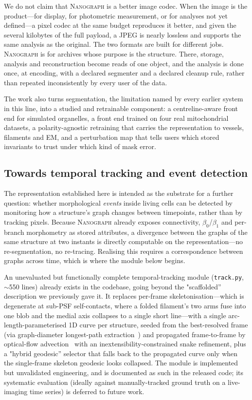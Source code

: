 \documentclass[10pt,a4paper]{article}
\newcommand{\method}{\textnormal{\textsc{Nanograph}}\xspace}
\begin{document}
We do not claim that \method is a better image codec. When the image is
the product---for display, for photometric measurement, or for analyses
not yet defined---a pixel codec at the same budget reproduces it better,
and given the several kilobytes of the full payload, a JPEG is nearly
lossless and supports the same analysis as the original. The two formats
are built for different jobs. \method is for archives whose purpose is the
structure. There, storage, analysis and reconstruction become reads of one
object, and the analysis is done once, at encoding, with a declared
segmenter and a declared cleanup rule, rather than repeated inconsistently
by every user of the data.

The work also turns segmentation, the limitation named by every earlier
system in this line, into a studied and retrainable component: a
centreline-aware front end for simulated organelles, a front end trained on
four real mitochondrial datasets, a polarity-agnostic retraining that
carries the representation to vessels, filaments and EM, and a
perturbation map that tells users which stored invariants to trust under
which kind of mask error.

\subsection{Towards temporal tracking and event detection}
The representation established here is intended as the substrate for a further
question: whether morphological \emph{events} inside living cells can be
detected by monitoring how a structure's graph changes between timepoints,
rather than by tracking pixels. Because \method already exposes connectivity,
$\beta_0$/$\beta_1$ and per-branch morphometry as stored attributes, a
divergence between the graphs of the same structure at two instants is
directly computable on the representation---no re-segmentation, no
re-tracing. Realising this requires a correspondence between graphs across
time, which is where the module below begins.

An unevaluated but functionally complete temporal-tracking module
(\texttt{track.py}, $\sim$550 lines) already exists in the codebase, going
beyond the "scaffolded'' description we previously gave it. It replaces
per-frame skeletonisation---which is degenerate at sub-PSF self-contacts,
where a folded filament's two arms fuse into one blob and the medial axis
collapses to a single short line---with a single arc-length-parameterised 1D
curve per structure, seeded from the best-resolved frame (via graph-diameter
longest-path extraction~\cite{hagberg2008networkx}) and propagated frame-to-frame by optical-flow
advection~\cite{farneback2003} with an inextensibility-constrained snake
refinement, plus a "hybrid geodesic'' selector that falls back to the
propagated curve only when the single-frame skeleton geodesic looks
collapsed. The module is
implemented but unvalidated engineering, and is documented as such in the
released code; its systematic evaluation (ideally against
manually-tracked ground truth on a live-imaging time series) is deferred to
future work.
\end{document}
